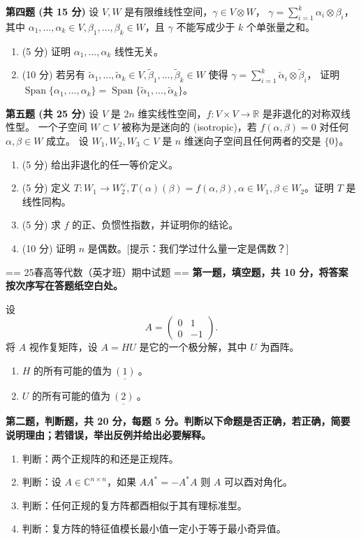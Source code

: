 \textbf{第四题 (共 15 分)} 设 $V, W$ 是有限维线性空间，$\gamma \in V \otimes W$，
$\gamma=\sum_{i=1}^{k} \alpha_{i} \otimes \beta_{i}$，
其中 $\alpha_{1}, \ldots, \alpha_{k} \in V, \beta_{1}, \ldots, \beta_{k} \in W$，且 $\gamma$ 不能写成少于 $k$ 个单张量之和。
\begin{enumerate}
\item (5 分) 证明 $\alpha_{1}, \ldots, \alpha_{k}$ 线性无关。
\item (10 分) 若另有 $\widetilde{\alpha}_{1}, \ldots, \widetilde{\alpha}_{k} \in V, \widetilde{\beta}_{1}, \ldots, \widetilde{\beta}_{k} \in W$ 
使得 $\gamma=\sum_{i=1}^{k} \widetilde{\alpha}_{i} \otimes \widetilde{\beta}_{i}$，
证明 $\operatorname{Span}\{\alpha_{1}, \ldots, \alpha_{k}\}=\operatorname{Span}\{\widetilde{\alpha}_{1}, \ldots, \widetilde{\alpha}_{k}\}$。
\end{enumerate}
\textbf{第五题 (共 25 分)} 设 $V$ 是 $2n$ 维实线性空间，$f: V \times V \rightarrow \mathbb{R}$ 是非退化的对称双线性型。
一个子空间 $W \subset V$ 被称为是迷向的 (isotropic)，若 $f(\alpha, \beta)=0$ 对任何 $\alpha, \beta \in W$ 成立。
设 $W_{1}, W_{2}, W_{3} \subset V$ 是 $n$ 维迷向子空间且任何两者的交是 $\{0\}$。
\begin{enumerate}
\item (5 分) 给出非退化的任一等价定义。
\item (5 分) 定义 $T: W_{1} \rightarrow W_{2}^{\vee}, T(\alpha)(\beta)=f(\alpha, \beta), \alpha \in W_{1}, \beta \in W_{2}$。证明 $T$ 是线性同构。
\item (5 分) 求 $f$ 的正、负惯性指数，并证明你的结论。
\item (10 分) 证明 $n$ 是偶数。[提示：我们学过什么量一定是偶数？]
\end{enumerate}

== 25春高等代数（英才班）期中试题 ==
\textbf{第一题，填空题，共 10 分，将答案按次序写在答题纸空白处。}

设
$$A=\begin{pmatrix}0 & 1 \\0 & -1\end{pmatrix}.$$
将 $A$ 视作复矩阵，设 $A=HU$ 是它的一个极分解，其中 $U$ 为酉阵。
\begin{enumerate}
\item $H$ 的所有可能的值为$\underline{\ (1)\ }$。
\item $U$ 的所有可能的值为$\underline{\ (2)\ }$。
\end{enumerate}

\textbf{第二题，判断题，共 20 分，每题 5 分。判断以下命题是否正确，若正确，简要说明理由；若错误，举出反例并给出必要解释。}
\begin{enumerate}
\item 判断：两个正规阵的和还是正规阵。
\item 判断：设 $A \in \mathbb{C}^{n \times n}$，如果 $AA^{*}=-A^{*}A$ 则 $A$ 可以酉对角化。
\item 判断：任何正规的复方阵都酉相似于其有理标准型。
\item 判断：复方阵的特征值模长最小值一定小于等于最小奇异值。
\end{enumerate}

